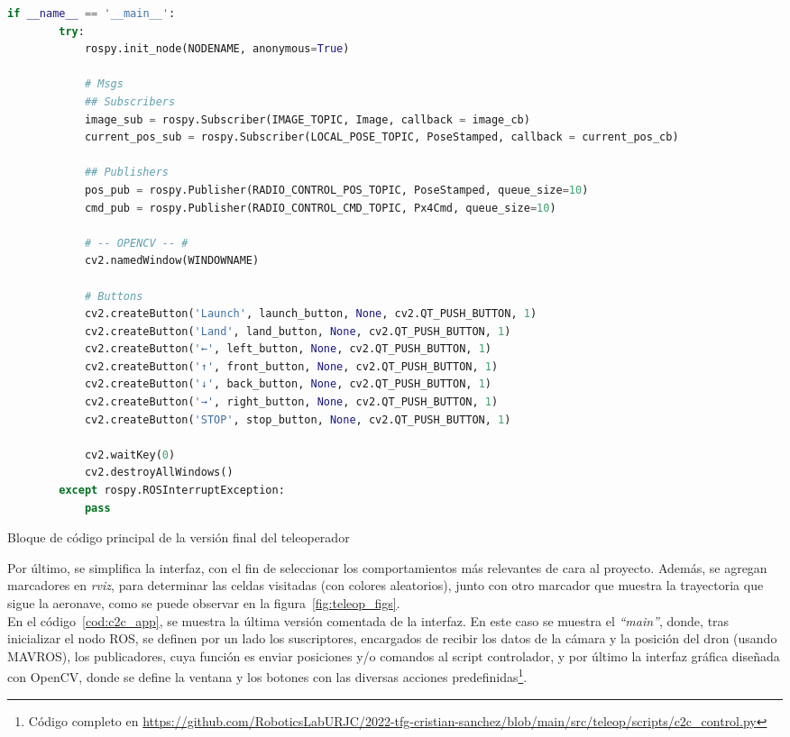 \begin{code}[tp]
    \begin{lstlisting}[language=Python]
    if __name__ == '__main__':
        try:
            rospy.init_node(NODENAME, anonymous=True)
    
            # Msgs
            ## Subscribers
            image_sub = rospy.Subscriber(IMAGE_TOPIC, Image, callback = image_cb)
            current_pos_sub = rospy.Subscriber(LOCAL_POSE_TOPIC, PoseStamped, callback = current_pos_cb)
    
            ## Publishers
            pos_pub = rospy.Publisher(RADIO_CONTROL_POS_TOPIC, PoseStamped, queue_size=10)
            cmd_pub = rospy.Publisher(RADIO_CONTROL_CMD_TOPIC, Px4Cmd, queue_size=10)
    
            # -- OPENCV -- #
            cv2.namedWindow(WINDOWNAME)
    
            # Buttons
            cv2.createButton('Launch', launch_button, None, cv2.QT_PUSH_BUTTON, 1)
            cv2.createButton('Land', land_button, None, cv2.QT_PUSH_BUTTON, 1)
            cv2.createButton('←', left_button, None, cv2.QT_PUSH_BUTTON, 1)
            cv2.createButton('↑', front_button, None, cv2.QT_PUSH_BUTTON, 1)
            cv2.createButton('↓', back_button, None, cv2.QT_PUSH_BUTTON, 1)
            cv2.createButton('→', right_button, None, cv2.QT_PUSH_BUTTON, 1)
            cv2.createButton('STOP', stop_button, None, cv2.QT_PUSH_BUTTON, 1)
    
            cv2.waitKey(0)
            cv2.destroyAllWindows()
        except rospy.ROSInterruptException:
            pass
    \end{lstlisting}
    \caption[Bloque de código principal de la versión final del teleoperador]{Bloque de código principal de la versión final del teleoperador}
    \label{cod:c2c_app}
\end{code}

Por último, se simplifica la interfaz, con el fin de seleccionar los comportamientos más relevantes de cara al proyecto. Además, se agregan marcadores en \emph{rviz}, para determinar las celdas visitadas (con colores aleatorios), junto con otro marcador que muestra la trayectoria que sigue la aeronave, como se puede observar en la figura~\ref{fig:teleop_figs}.\\

En el código~\ref{cod:c2c_app}, se muestra la última versión comentada de la interfaz. En este caso se muestra el \emph{``main''}, donde, tras inicializar el nodo \ac{ROS}, se definen por un lado los suscriptores, encargados de recibir los datos de la cámara y la posición del dron (usando MAVROS), los publicadores, cuya función es enviar posiciones y/o comandos al script controlador, y por último la interfaz gráfica diseñada con OpenCV, donde se define la ventana y los botones con las diversas acciones predefinidas\footnote[2]{Código completo en \url{https://github.com/RoboticsLabURJC/2022-tfg-cristian-sanchez/blob/main/src/teleop/scripts/c2c_control.py}}.\\

